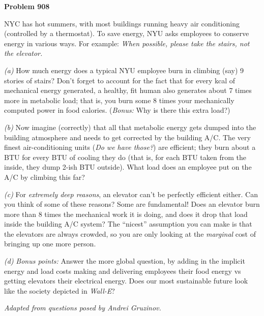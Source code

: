 \documentclass[12pt]{article}
\begin{document}
\begin{pottproblem}
\textbf{Problem 908}

NYC has hot summers, with most buildings running heavy air
conditioning (controlled by a thermostat). To save energy, NYU asks
employees to conserve energy in various ways.
For example: \emph{When possible, please take the stairs, not the elevator.}

\textsl{(a)} How much energy does a typical NYU employee
burn in climbing (say) 9 stories of stairs?
Don't forget to account for the fact that for every kcal of mechanical
energy generated, a healthy, fit human also generates about 7 times
more in metabolic load; that is, you burn some 8 times your
mechanically computed power in food calories. (\emph{Bonus:} Why is there this extra load?)

\textsl{(b)} Now imagine (correctly) that all that metabolic energy
gets dumped into the building atmosphere and needs to get corrected by
the building A/C.
The very finest air-conditioning units (\emph{Do we have those?}) are
efficient; they burn about a BTU
for every BTU of cooling they do (that is, for each BTU taken from the inside,
they dump 2-ish BTU outside).
What load does an employee put on the A/C by climbing this far?

\textsl{(c)} For \emph{extremely deep reasons}, an
elevator can't be perfectly efficient either. Can you think of some of
these reasons? Some are fundamental!
Does an elevator burn
more than 8 times the mechanical work it is doing, and does it
drop that load inside the building A/C system? The ``nicest'' assumption you can make
is that the elevators are always crowded, so you are only
looking at the \emph{marginal} cost of bringing up one more person.

\textsl{(d)} \emph{Bonus points:} Answer the more global question, by
adding in the implicit energy and load costs making
and delivering employees their food energy vs getting elevators their electrical energy.
Does our most sustainable future look like the society depicted in \textsl{Wall-E}?

{\normalsize\emph{Adapted from questions posed by Andrei Gruzinov.}}
\end{pottproblem}
\end{document}
